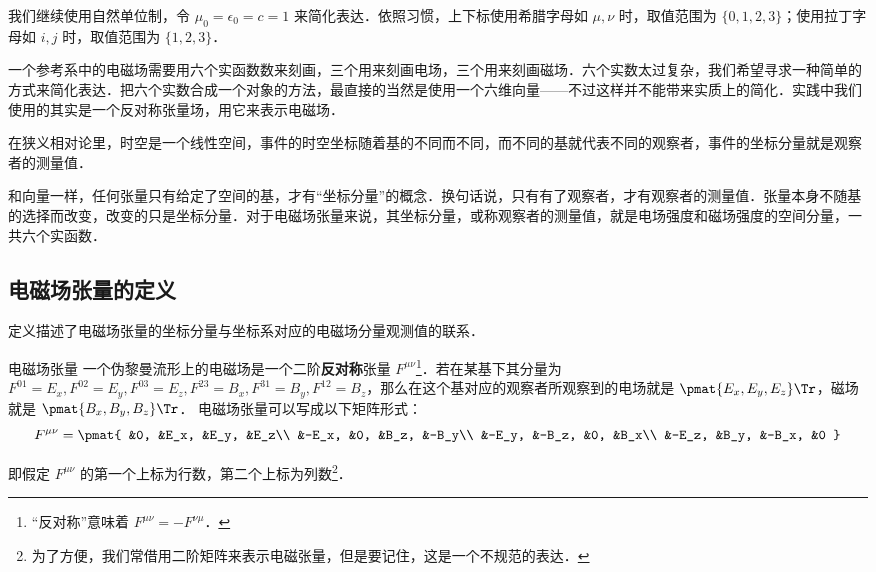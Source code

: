 

我们继续使用自然单位制，令 $\mu_0=\epsilon_0=c=1$ 来简化表达．依照习惯，上下标使用希腊字母如 $\mu, \nu$ 时，取值范围为 $\{0, 1, 2, 3\}$；使用拉丁字母如 $i, j$ 时，取值范围为 $\{1, 2, 3\}$．

一个参考系中的电磁场需要用六个实函数数来刻画，三个用来刻画电场，三个用来刻画磁场．六个实数太过复杂，我们希望寻求一种简单的方式来简化表达．把六个实数合成一个对象的方法，最直接的当然是使用一个六维向量——不过这样并不能带来实质上的简化．实践中我们使用的其实是一个反对称张量场，用它来表示电磁场．

在狭义相对论里，时空是一个线性空间，事件的时空坐标随着基的不同而不同，而不同的基就代表不同的观察者，事件的坐标分量就是观察者的测量值．

和向量一样，任何张量只有给定了空间的基，才有“坐标分量”的概念．换句话说，只有有了观察者，才有观察者的测量值．张量本身不随基的选择而改变，改变的只是坐标分量．对于电磁场张量来说，其坐标分量，或称观察者的测量值，就是电场强度和磁场强度的空间分量，一共六个实函数．

\subsection{电磁场张量的定义}

定义描述了电磁场张量的坐标分量与坐标系对应的电磁场分量观测值的联系．

\begin{definition}{电磁场张量}
一个伪黎曼流形上的电磁场是一个二阶\textbf{反对称}张量 $F^{\mu\nu}$\footnote{“反对称”意味着 $F^{\mu\nu}=-F^{\nu\mu}$．}．若在某基下其分量为 $F^{01}=E_x, F^{02}=E_y, F^{03}=E_z, F^{23}=B_x, F^{31}=B_y, F^{12}=B_z$，那么在这个基对应的观察者所观察到的电场就是 $\pmat{E_x, E_y, E_z}\Tr$，磁场就是 $\pmat{B_x, B_y, B_z}\Tr$．
电磁场张量可以写成以下矩阵形式：
\begin{equation}\label{EMFT_eq1}
F^{\mu\nu}=\pmat{
&0, &E_x, &E_y, &E_z\\
&-E_x, &0, &B_z, &-B_y\\
&-E_y, &-B_z, &0, &B_x\\
&-E_z, &B_y, &-B_x, &0
}
\end{equation}
\end{definition}
即假定 $F^{\mu\nu}$ 的第一个上标为行数，第二个上标为列数\footnote{为了方便，我们常借用二阶矩阵来表示电磁张量，但是要记住，这是一个不规范的表达．}．

